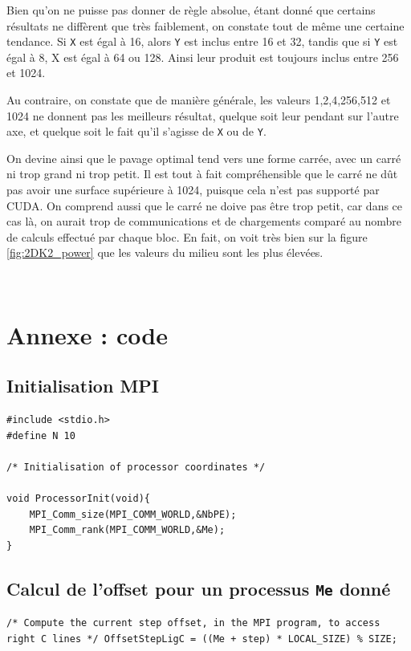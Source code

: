 \documentclass[	DIV=calc,%
							paper=a4,%
							fontsize=11pt%
							]{scrartcl}	 					%
\begin{document}
Bien qu'on ne puisse pas donner de règle absolue, étant donné que certains résultats ne diffèrent que très faiblement, on constate tout de même une certaine tendance. Si \texttt{X} est égal à 16, alors \texttt{Y} est inclus entre 16 et 32, tandis que si \texttt{Y} est égal à 8, X est égal à 64 ou 128. Ainsi leur produit est toujours inclus entre 256 et 1024.\par
Au contraire, on constate que de manière générale, les valeurs 1,2,4,256,512 et 1024 ne donnent pas les meilleurs résultat, quelque soit leur pendant sur l'autre axe, et quelque soit le fait qu'il s'agisse de \texttt{X} ou de \texttt{Y}.\par
On devine ainsi que le pavage optimal tend vers une forme carrée, avec un carré ni trop grand ni trop petit. Il est tout à fait compréhensible que le carré ne dût pas avoir une surface supérieure à 1024, puisque cela n'est pas supporté par CUDA. On comprend aussi que le carré ne doive pas être trop petit, car dans ce cas là, on aurait trop de communications et de chargements comparé au nombre de calculs effectué par chaque bloc. En fait, on voit très bien sur la figure \ref{fig:2DK2_power} que les valeurs du milieu sont les plus élevées.

\ 


\section{Annexe : code}

\subsection*{Initialisation MPI}
\begin{lstlisting}
#include <stdio.h>
#define N 10

/* Initialisation of processor coordinates */

void ProcessorInit(void){
	MPI_Comm_size(MPI_COMM_WORLD,&NbPE);
  	MPI_Comm_rank(MPI_COMM_WORLD,&Me);
}
\end{lstlisting}

\newpage

\subsection*{Calcul de l'offset pour un processus {\texttt{Me} donné}}
\begin{lstlisting}
/* Compute the current step offset, in the MPI program, to access right C lines */ OffsetStepLigC = ((Me + step) * LOCAL_SIZE) % SIZE; 
\end{lstlisting}
\end{document}
